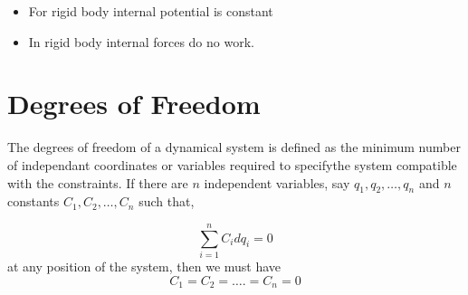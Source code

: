  
\begin{itemize}
	\item For rigid body internal potential is constant
	\item  In rigid body internal forces do no work.
\end{itemize}
\section{Degrees of Freedom}
The degrees of freedom of a dynamical system is defined as the minimum number of independant coordinates or variables required to specifythe system compatible with the constraints. 
 If there are $n$ independent variables, say $q_1, q_2, \ldots, q_n$ and $n$ constants $C_1, C_2, \ldots, C_n$ such that,
 
$$
\sum_{i=1}^n C_i d q_i=0
$$
at any position of the system, then we must have
$$
C_1=C_2=\ldots .=C_n=0
$$
